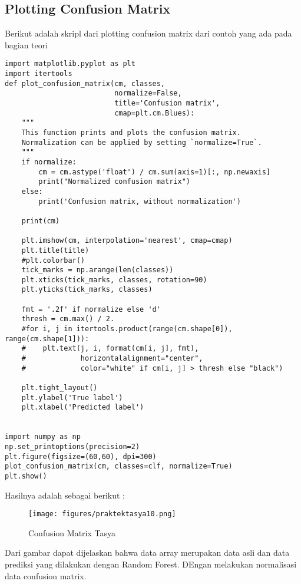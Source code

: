 \subsection{Plotting Confusion Matrix}
Berikut adalah skripl dari plotting confusion matrix dari contoh yang ada pada bagian teori
\begin{verbatim}
import matplotlib.pyplot as plt
import itertools
def plot_confusion_matrix(cm, classes,
                          normalize=False,
                          title='Confusion matrix',
                          cmap=plt.cm.Blues):
    """
    This function prints and plots the confusion matrix.
    Normalization can be applied by setting `normalize=True`.
    """
    if normalize:
        cm = cm.astype('float') / cm.sum(axis=1)[:, np.newaxis]
        print("Normalized confusion matrix")
    else:
        print('Confusion matrix, without normalization')

    print(cm)

    plt.imshow(cm, interpolation='nearest', cmap=cmap)
    plt.title(title)
    #plt.colorbar()
    tick_marks = np.arange(len(classes))
    plt.xticks(tick_marks, classes, rotation=90)
    plt.yticks(tick_marks, classes)

    fmt = '.2f' if normalize else 'd'
    thresh = cm.max() / 2.
    #for i, j in itertools.product(range(cm.shape[0]), range(cm.shape[1])):
    #    plt.text(j, i, format(cm[i, j], fmt),
    #             horizontalalignment="center",
    #             color="white" if cm[i, j] > thresh else "black")

    plt.tight_layout()
    plt.ylabel('True label')
    plt.xlabel('Predicted label')


import numpy as np
np.set_printoptions(precision=2)
plt.figure(figsize=(60,60), dpi=300)
plot_confusion_matrix(cm, classes=clf, normalize=True)
plt.show()
\end{verbatim}
Hasilnya adalah sebagai berikut :
\begin{figure}[ht]
\centering
\texttt{[image: figures/praktektasya10.png]}
\caption{Confusion Matrix Tasya}
\label{Praktek}
\end{figure}
Dari gambar dapat dijelaskan bahwa data array merupakan data asli dan data prediksi yang dilakukan dengan Random Forest. DEngan melakukan normalisasi data confusion matrix.


